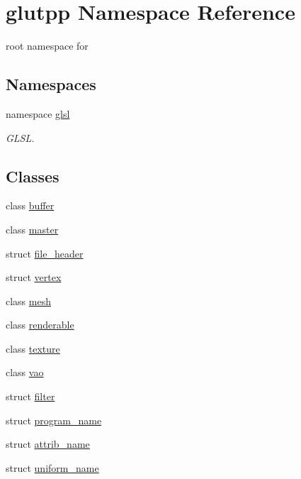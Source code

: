\hypertarget{namespaceglutpp}{\section{glutpp \-Namespace \-Reference}
\label{namespaceglutpp}
}


root namespace for   


\subsection*{\-Namespaces}
\begin{DoxyCompactItemize}
\item 
namespace \hyperlink{namespaceglutpp_1_1glsl}{glsl}
\begin{DoxyCompactList}\small\item\em \-G\-L\-S\-L. \end{DoxyCompactList}\end{DoxyCompactItemize}
\subsection*{\-Classes}
\begin{DoxyCompactItemize}
\item 
class \hyperlink{classglutpp_1_1buffer}{buffer}
\item 
class \hyperlink{classglutpp_1_1master}{master}
\item 
struct \hyperlink{structglutpp_1_1file__header}{file\-\_\-header}
\item 
struct \hyperlink{structglutpp_1_1vertex}{vertex}
\item 
class \hyperlink{classglutpp_1_1mesh}{mesh}
\item 
class \hyperlink{classglutpp_1_1renderable}{renderable}
\item 
class \hyperlink{classglutpp_1_1texture}{texture}
\item 
class \hyperlink{classglutpp_1_1vao}{vao}
\item 
struct \hyperlink{structglutpp_1_1filter}{filter}
\item 
struct \hyperlink{structglutpp_1_1program__name}{program\-\_\-name}
\item 
struct \hyperlink{structglutpp_1_1attrib__name}{attrib\-\_\-name}
\item 
struct \hyperlink{structglutpp_1_1uniform__name}{uniform\-\_\-name}
\end{DoxyCompactItemize}
